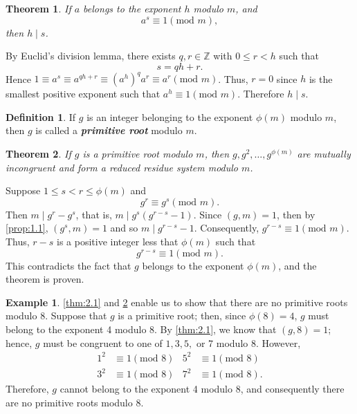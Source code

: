 \documentclass{article}
\makeatletter
\newtheorem{theorem}{Theorem}[section]
\theoremstyle{definition}
\newtheorem{definition}{Definition}[section]
\theoremstyle{remark}
\let\oldproofname=\proofname
\renewcommand{\proofname}{\textit{\oldproofname}}
\theoremstyle{definition}
\newtheorem{example}{Example}[section]
\renewenvironment{proof}[1][\proofname]{\par
  \pushQED{\qed}%
  \normalfont \topsep6\p@\@plus6\p@\relax
  \list{}{\leftmargin=0mm
          \rightmargin=0mm
          \settowidth{\itemindent}{\itshape#1}%
          \labelwidth=\itemindent
          \parsep=0pt \listparindent=0mm%
  }
  \item[\hskip\labelsep
        \itshape
    #1\@addpunct{.}]\ignorespaces
}{%
  \popQED\endlist\@endpefalse
}
\makeatother
\begin{document}
    \begin{theorem}\label{thm:2.2}
        If $a$ belongs to the exponent $h$ modulo $m$, and 
            \begin{equation*}
                a^s\equiv 1(\text{mod }m),
            \end{equation*}
        then $h\mid s$.
    \end{theorem}
        \begin{proof}
            By Euclid's division lemma, there exists $q,r\in\mathbb{Z}$ with $0\leq r<h$ such that
                \begin{equation*}
                    s=qh+r.
                \end{equation*}
            Hence $1\equiv a^s\equiv a^{qh+r}\equiv(a^h)^qa^r\equiv a^r(\text{mod }m)$. Thus, $r=0$ since $h$ is the smallest positive exponent such that $a^h\equiv 1(\text{mod }m)$. Therefore $h\mid s$.
        \end{proof}
    \begin{definition}\label{def:2.2}
        If $g$ is an integer belonging to the exponent $\phi(m)$ modulo $m$, then $g$ is called a \textbf{\textit{primitive root}} modulo $m$. 
    \end{definition}
    \begin{theorem}\label{thm:2.3}
        If $g$ is a primitive root modulo $m$, then $g,g^2,\dots,g^{\phi(m)}$ are mutually incongruent and form a reduced residue system modulo $m$.
    \end{theorem}
        \begin{proof}
            Suppose $1\leq s<r\leq\phi(m)$ and 
                \begin{equation*}
                    g^r\equiv g^s(\text{mod }m).
                \end{equation*}
            Then $m\mid g^r-g^s$, that is, $m\mid g^s(g^{r-s}-1)$. Since $(g,m)=1$, then by \cref{prop:1.1}, $(g^s,m)=1$ and so $m\mid g^{r-s}-1$. Consequently, $g^{r-s}\equiv 1(\text{mod }m)$. Thus, $r-s$ is a positive integer less that $\phi(m)$ such that 
                \begin{equation*}
                    g^{r-s}\equiv 1(\text{mod }m).
                \end{equation*}
            This contradicts the fact that $g$ belongs to the exponent $\phi(m)$, and the theorem is proven.
        \end{proof}
    \begin{example}\label{ex:2.2}
        \cref{thm:2.1} and \cref{thm:2.3} enable us to show that there are no primitive roots modulo 8. Suppose that $g$ is a primitive root; then, since $\phi(8)=4$, $g$ must belong to the exponent 4 modulo 8. By \cref{thm:2.1}, we know that $(g,8)=1$; hence, $g$ must be congruent to one of $1,3,5,$ or 7 modulo 8. However, 
            \begin{align*}
                1^2&\equiv1(\text{mod }8) & 5^2&\equiv 1(\text{mod }8) \\
                3^2&\equiv 1(\text{mod }8) & 7^2&\equiv 1(\text{mod }8).
            \end{align*}
        Therefore, $g$ cannot belong to the exponent 4 modulo 8, and consequently there are no primitive roots modulo 8. \newpage
    \end{example}
\end{document}
